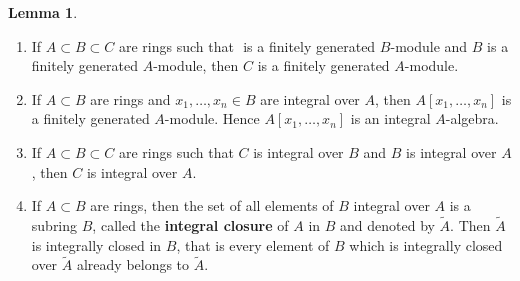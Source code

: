 \documentclass{article}
\renewcommand{\sb}[1]{\left[ #1 \right]}
\theoremstyle{definition}\newtheorem{definition}{Definition}[section]
\theoremstyle{definition}\newtheorem{remark}[definition]{Remark}
\theoremstyle{definition}\newtheorem*{example}{Example}
\theoremstyle{definition}\newtheorem*{note}{Note}
\newtheorem{lemma}[definition]{Lemma}
\begin{document}
\begin{lemma}
\hfill
\begin{enumerate}
\item If $ A \subset B \subset C $ are rings such that $  $ is a finitely generated $ B $-module and $ B $ is a finitely generated $ A $-module, then $ C $ is a finitely generated $ A $-module.
\item If $ A \subset B $ are rings and $ x_1, \dots, x_n \in B $ are integral over $ A $, then $ A\sb{x_1, \dots, x_n} $ is a finitely generated $ A $-module. Hence $ A\sb{x_1, \dots, x_n} $ is an integral $ A $-algebra.
\item If $ A \subset B \subset C $ are rings such that $ C $ is integral over $ B $ and $ B $ is integral over $ A $, then $ C $ is integral over $ A $.
\item If $ A \subset B $ are rings, then the set of all elements of $ B $ integral over $ A $ is a subring $ B $, called the \textbf{integral closure} of $ A $ in $ B $ and denoted by $ \widetilde{A} $. Then $ \widetilde{A} $ is integrally closed in $ B $, that is every element of $ B $ which is integrally closed over $ \widetilde{A} $ already belongs to $ \widetilde{A} $.
\end{enumerate}
\end{lemma}
\end{document}
